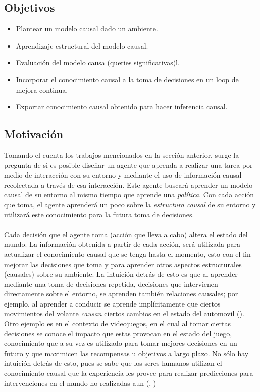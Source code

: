 \documentclass[11pt]{article}
\theoremstyle{plain}
\begin{document}
\subsection{Objetivos}
\begin{itemize}
\item Plantear un modelo causal dado un ambiente.
\item Aprendizaje estructural del modelo causal.
\item Evaluación del modelo causa (queries significativas)l.
\item Incorporar el conocimiento causal a la toma de decisiones en un loop de mejora continua.
\item Exportar conocimiento causal obtenido para hacer inferencia causal.
\end{itemize}
\subsection{Motivación}
Tomando el cuenta los trabajos mencionados en la sección anterior, surge la pregunta de si es posible diseñar un agente que aprenda a realizar una tarea por medio de interacción con su entorno y mediante el uso de información causal recolectada a través de esa interacción. Este agente buscará aprender un modelo causal de su entorno al mismo tiempo que aprende una \textit{política}. Con cada acción que toma, el agente aprenderá  un poco sobre la \textit{estructura causal} de su entorno y utilizará este conocimiento para la futura toma de decisiones.\\
\\
Cada decisión que el agente toma (acción que lleva a cabo) altera el estado del mundo. La información obtenida a partir de cada acción, será utilizada para actualizar el conocimiento causal que se tenga hasta el momento, esto con el fin mejorar las decisiones que toma y para aprender otros aspectos estructurales (causales) sobre su ambiente. La intuición detrás de esto es que al aprender mediante una toma de decisiones repetida, decisiones que intervienen directamente sobre el entorno, se aprenden también relaciones causales; por ejemplo, al aprender a conducir se aprende implícitamente que ciertos movimientos del volante \textit{causan} ciertos cambios en el estado del automovil (\cite{danks2014unifying}). Otro ejemplo es en el contexto de videojuegos, en el cual al tomar ciertas decisiones se conoce el impacto que estas provocan en el estado del juego, conocimiento que a su vez es utilizado para tomar mejores decisiones en un futuro y que maximicen las recompensas u objetivos a largo plazo. No sólo hay intuición detrás de esto, pues se sabe que los seres humanos utilizan el conocimiento causal que la experiencia les provee para realizar predicciones para intervenciones en el mundo no realizadas aun (\cite{meder2008inferring}, \cite{hagmayer2009decision})\\
\end{document}
